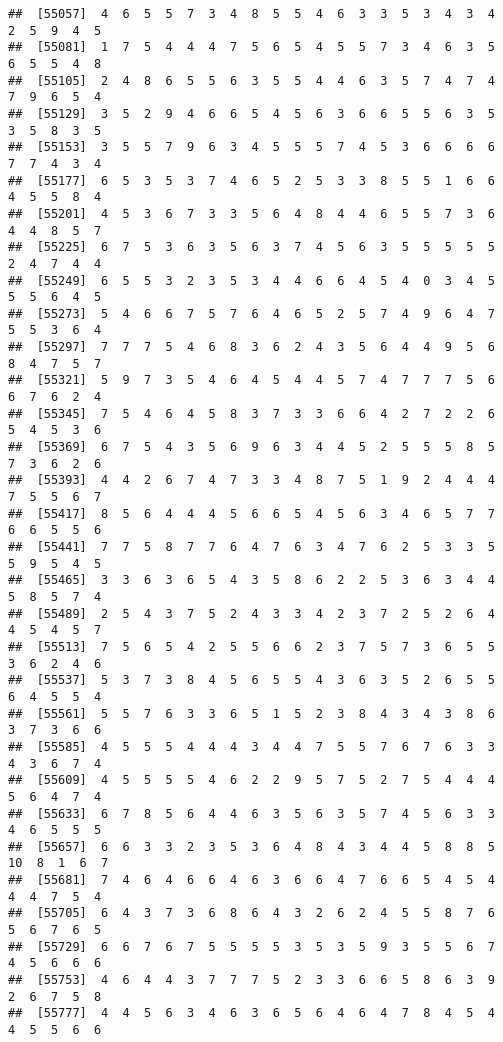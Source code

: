 \documentclass[
]{book}
\begin{document}
\begin{verbatim}
##  [55057]  4  6  5  5  7  3  4  8  5  5  4  6  3  3  5  3  4  3  4  2  5  9  4  5
##  [55081]  1  7  5  4  4  4  7  5  6  5  4  5  5  7  3  4  6  3  5  6  5  5  4  8
##  [55105]  2  4  8  6  5  5  6  3  5  5  4  4  6  3  5  7  4  7  4  7  9  6  5  4
##  [55129]  3  5  2  9  4  6  6  5  4  5  6  3  6  6  5  5  6  3  5  3  5  8  3  5
##  [55153]  3  5  5  7  9  6  3  4  5  5  5  7  4  5  3  6  6  6  6  7  7  4  3  4
##  [55177]  6  5  3  5  3  7  4  6  5  2  5  3  3  8  5  5  1  6  6  4  5  5  8  4
##  [55201]  4  5  3  6  7  3  3  5  6  4  8  4  4  6  5  5  7  3  6  4  4  8  5  7
##  [55225]  6  7  5  3  6  3  5  6  3  7  4  5  6  3  5  5  5  5  5  2  4  7  4  4
##  [55249]  6  5  5  3  2  3  5  3  4  4  6  6  4  5  4  0  3  4  5  5  5  6  4  5
##  [55273]  5  4  6  6  7  5  7  6  4  6  5  2  5  7  4  9  6  4  7  5  5  3  6  4
##  [55297]  7  7  7  5  4  6  8  3  6  2  4  3  5  6  4  4  9  5  6  8  4  7  5  7
##  [55321]  5  9  7  3  5  4  6  4  5  4  4  5  7  4  7  7  7  5  6  6  7  6  2  4
##  [55345]  7  5  4  6  4  5  8  3  7  3  3  6  6  4  2  7  2  2  6  5  4  5  3  6
##  [55369]  6  7  5  4  3  5  6  9  6  3  4  4  5  2  5  5  5  8  5  7  3  6  2  6
##  [55393]  4  4  2  6  7  4  7  3  3  4  8  7  5  1  9  2  4  4  4  7  5  5  6  7
##  [55417]  8  5  6  4  4  4  5  6  6  5  4  5  6  3  4  6  5  7  7  6  6  5  5  6
##  [55441]  7  7  5  8  7  7  6  4  7  6  3  4  7  6  2  5  3  3  5  5  9  5  4  5
##  [55465]  3  3  6  3  6  5  4  3  5  8  6  2  2  5  3  6  3  4  4  5  8  5  7  4
##  [55489]  2  5  4  3  7  5  2  4  3  3  4  2  3  7  2  5  2  6  4  4  5  4  5  7
##  [55513]  7  5  6  5  4  2  5  5  6  6  2  3  7  5  7  3  6  5  5  3  6  2  4  6
##  [55537]  5  3  7  3  8  4  5  6  5  5  4  3  6  3  5  2  6  5  5  6  4  5  5  4
##  [55561]  5  5  7  6  3  3  6  5  1  5  2  3  8  4  3  4  3  8  6  3  7  3  6  6
##  [55585]  4  5  5  5  4  4  4  3  4  4  7  5  5  7  6  7  6  3  3  4  3  6  7  4
##  [55609]  4  5  5  5  5  4  6  2  2  9  5  7  5  2  7  5  4  4  4  5  6  4  7  4
##  [55633]  6  7  8  5  6  4  4  6  3  5  6  3  5  7  4  5  6  3  3  4  6  5  5  5
##  [55657]  6  6  3  3  2  3  5  3  6  4  8  4  3  4  4  5  8  8  5 10  8  1  6  7
##  [55681]  7  4  6  4  6  6  4  6  3  6  6  4  7  6  6  5  4  5  4  4  4  7  5  4
##  [55705]  6  4  3  7  3  6  8  6  4  3  2  6  2  4  5  5  8  7  6  5  6  7  6  5
##  [55729]  6  6  7  6  7  5  5  5  5  3  5  3  5  9  3  5  5  6  7  4  5  6  6  6
##  [55753]  4  6  4  4  3  7  7  7  5  2  3  3  6  6  5  8  6  3  9  2  6  7  5  8
##  [55777]  4  4  5  6  3  4  6  3  6  5  6  4  6  4  7  8  4  5  4  4  5  5  6  6

\end{verbatim}
\end{document}
